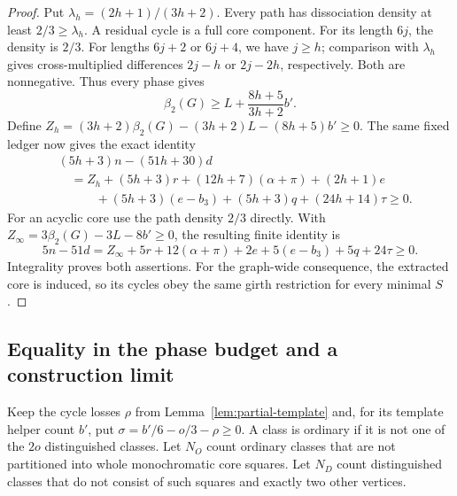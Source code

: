 \documentclass[11pt]{article}
\newcommand{\diss}{\beta_2}
\begin{document}
\begin{proof}
Put $\lambda_h=(2h+1)/(3h+2)$. Every path has dissociation density
at least $2/3\ge\lambda_h$. A residual cycle is a full core component.
For its length $6j$, the density is $2/3$. For lengths $6j+2$ or $6j+4$,
we have $j\ge h$; comparison with $\lambda_h$ gives cross-multiplied
differences $2j-h$ or $2j-2h$, respectively. Both are nonnegative.
Thus every phase gives
\[
 \diss(G)\ge L+\frac{8h+5}{3h+2}b'.
\]
Define $Z_h=(3h+2)\diss(G)-(3h+2)L-(8h+5)b'\ge0$. The same fixed
ledger now gives the exact identity
\begin{align*}
 &(5h+3)n-(51h+30)d\\
 &\quad=Z_h+(5h+3)r+(12h+7)(\alpha+\pi)+(2h+1)e\\
 &\qquad\quad +(5h+3)(e-b_3)+(5h+3)q+(24h+14)\tau\ge0.
\end{align*}
For an acyclic core use the path density $2/3$ directly. With
$Z_\infty=3\diss(G)-3L-8b'\ge0$, the resulting finite identity is
\[
 5n-51d=Z_\infty+5r+12(\alpha+\pi)+2e
               +5(e-b_3)+5q+24\tau\ge0.
\]
Integrality proves both assertions. For the graph-wide consequence,
the extracted core is induced, so its cycles obey the same girth
restriction for every minimal $S$.
\end{proof}

\subsection{Equality in the phase budget and a construction limit}

Keep the cycle losses $\rho$ from Lemma~\ref{lem:partial-template} and,
for its template helper count $b'$, put
$\sigma=b'/6-o/3-\rho\ge0$. A class is ordinary if it is not one of
the $2o$ distinguished classes. Let $N_O$ count ordinary classes that
are not partitioned into whole monochromatic core squares. Let $N_D$
count distinguished classes that do not consist of such squares and
exactly two other vertices.
\end{document}
